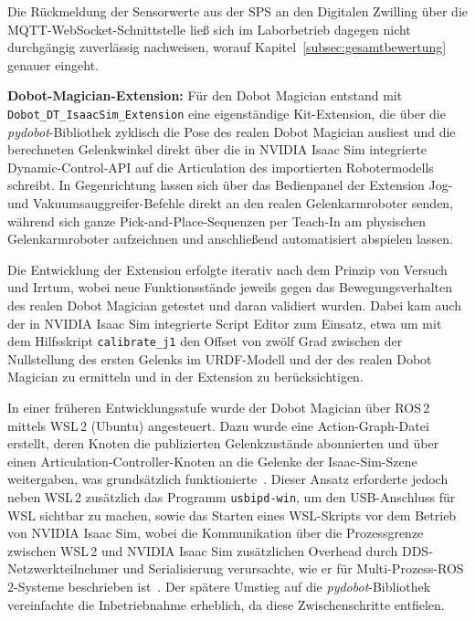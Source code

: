 Die Rückmeldung der Sensorwerte aus der SPS an den Digitalen Zwilling über die MQTT-WebSocket-Schnittstelle ließ sich im Laborbetrieb dagegen nicht durchgängig zuverlässig nachweisen, worauf Kapitel~\ref{subsec:gesamtbewertung} genauer eingeht.

\textbf{Dobot-Magician-Extension:} Für den Dobot Magician entstand mit \texttt{Dobot\_\allowbreak DT\_\allowbreak IsaacSim\_\allowbreak Extension} eine eigenständige Kit-Extension, die über die \emph{pydobot}-Bibliothek zyklisch die Pose des realen Dobot Magician ausliest und die berechneten Gelenkwinkel direkt über die in NVIDIA Isaac Sim integrierte Dynamic-Control-API auf die Articulation des importierten Robotermodells schreibt. In Gegenrichtung lassen sich über das Bedienpanel der Extension Jog- und Vakuumsauggreifer-Befehle direkt an den realen Gelenkarmroboter senden, während sich ganze Pick-and-Place-Sequenzen per Teach-In am physischen Gelenkarmroboter aufzeichnen und anschließend automatisiert abspielen lassen.

Die Entwicklung der Extension erfolgte iterativ nach dem Prinzip von Versuch und Irrtum, wobei neue Funktionsstände jeweils gegen das Bewegungsverhalten des realen Dobot Magician getestet und daran validiert wurden. Dabei kam auch der in NVIDIA Isaac Sim integrierte Script Editor zum Einsatz, etwa um mit dem Hilfsskript \texttt{calibrate\_j1} den Offset von zwölf Grad zwischen der Nullstellung des ersten Gelenks im URDF-Modell und der des realen Dobot Magician zu ermitteln und in der Extension zu berücksichtigen.

In einer früheren Entwicklungsstufe wurde der Dobot Magician über ROS\,2 mittels WSL\,2 (Ubuntu) angesteuert.
Dazu wurde eine Action-Graph-Datei erstellt, deren Knoten die publizierten Gelenkzustände abonnierten und über einen Articulation-Controller-Knoten an die Gelenke der Isaac-Sim-Szene weitergaben, was grundsätzlich funktionierte~\cite{nvidia_isaacsim_ros2_manipulation}.
Dieser Ansatz erforderte jedoch neben WSL\,2 zusätzlich das Programm \texttt{usbipd-win}, um den USB-Anschluss für WSL sichtbar zu machen, sowie das Starten eines WSL-Skripts vor dem Betrieb von NVIDIA Isaac Sim, wobei die Kommunikation über die Prozessgrenze zwischen WSL\,2 und NVIDIA Isaac Sim zusätzlichen Overhead durch DDS-Netzwerkteilnehmer und Serialisierung verursachte, wie er für Multi-Prozess-ROS\,2-Systeme beschrieben ist~\cite{macenski2023composition}.
Der spätere Umstieg auf die \emph{pydobot}-Bibliothek vereinfachte die Inbetriebnahme erheblich, da diese Zwischenschritte entfielen.

